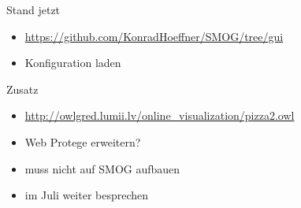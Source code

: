 \documentclass[14pt,aspectratio=1610]{beamer}
\begin{document}
\begin{frame}{Stand jetzt}
\begin{itemize}
\item \url{https://github.com/KonradHoeffner/SMOG/tree/gui}
\item Konfiguration laden
\end{itemize}
\end{frame}

\begin{frame}{Zusatz}
\begin{itemize}
\item \url{http://owlgred.lumii.lv/online\_visualization/pizza2.owl}
\item Web Protege erweitern?
\item muss nicht auf SMOG aufbauen
\item im Juli weiter besprechen
\end{itemize}
\end{frame}
\end{document}
